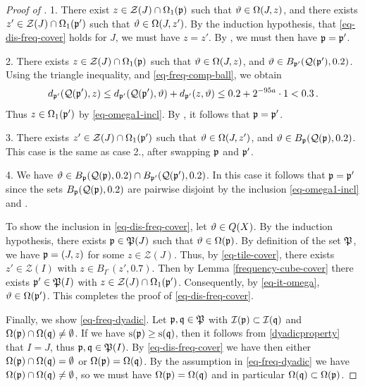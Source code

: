 \begin{proof}[Proof of ]
    1. There exist $z \in \mathcal{Z}(J) \cap \Omega_1({\mathfrak p})$ such that ${\vartheta} \in \Omega(J, z)$, and there exists $z' \in \mathcal{Z}(J) \cap \Omega_1({\mathfrak p}')$ such that ${\vartheta} \in \Omega(J, z')$. By the induction hypothesis, that \eqref{eq-dis-freq-cover} holds for $J$, we must have $z = z'$. By , we must then have ${\mathfrak p} = {\mathfrak p}'$.

    2. There exists $z \in \mathcal{Z}(J) \cap \Omega_1({\mathfrak p})$ such that ${\vartheta} \in \Omega(J,z)$, and ${\vartheta} \in B_{{\mathfrak p}'}({\mathcal{Q}}({\mathfrak p}'), 0.2)$. Using the triangle inequality,  and \eqref{eq-freq-comp-ball}, we obtain
    $$
        d_{{\mathfrak p}'}({\mathcal{Q}}({\mathfrak p}'),z) \le d_{{\mathfrak p}'}({\mathcal{Q}}({\mathfrak p}'), {\vartheta}) + d_{{\mathfrak p}'}(z, {\vartheta}) \le 0.2 + 2^{-95a} \cdot 1 < 0.3\,.
    $$
    Thus $z \in \Omega_1({\mathfrak p}')$ by \eqref{eq-omega1-incl}. By , it follows that ${\mathfrak p} = {\mathfrak p}'$.

    3. There exists $z' \in \mathcal{Z}(J) \cap \Omega_1({\mathfrak p}')$ such that ${\vartheta} \in \Omega(J,z')$, and ${\vartheta} \in B_{{\mathfrak p}}({\mathcal{Q}}({\mathfrak p}), 0.2)$. This case is the same as case 2., after swapping ${\mathfrak p}$ and ${\mathfrak p}'$.

    4. We have ${\vartheta} \in B_{{\mathfrak p}}({\mathcal{Q}}({\mathfrak p}), 0.2) \cap B_{{\mathfrak p}'}({\mathcal{Q}}({\mathfrak p}'), 0.2)$. In this case it follows that ${\mathfrak p} = {\mathfrak p}'$ since the sets $B_{{\mathfrak p}}({\mathcal{Q}}({\mathfrak p}), 0.2)$ are pairwise disjoint by the inclusion \eqref{eq-omega1-incl} and .

    To show the inclusion in \eqref{eq-dis-freq-cover}, let ${\vartheta} \in {Q}(X)$. By the induction hypothesis, there exists ${\mathfrak p} \in {\mathfrak P}(J)$ such that ${\vartheta} \in \Omega({\mathfrak p})$. By definition of the set ${\mathfrak P}$, we have ${\mathfrak p} = (J, z)$ for some $z \in \mathcal{Z}(J)$.
    Thus, by \eqref{eq-tile-cover}, there exists $z' \in \mathcal{Z}(I)$ with $z \in B_{I^\circ}(z', 0.7)$. Then by Lemma \eqref{frequency-cube-cover} there exists ${\mathfrak p}' \in {\mathfrak P}(I)$ with $z \in \mathcal{Z}(J) \cap \Omega_1({\mathfrak p}')$. Consequently, by \eqref{eq-it-omega}, ${\vartheta} \in {\Omega}({\mathfrak p}')$. This completes the proof of \eqref{eq-dis-freq-cover}.

    Finally, we show \eqref{eq-freq-dyadic}. Let ${\mathfrak p}, {\mathfrak q} \in {\mathfrak P}$ with ${\mathcal{I}}({\mathfrak p}) \subset {\mathcal{I}}({\mathfrak q})$ and ${\Omega}({\mathfrak p}) \cap {\Omega}({\mathfrak q}) \ne \emptyset$. If we have ${\mathrm{s}}({\mathfrak p}) \ge {\mathrm{s}}({\mathfrak q})$, then it follows from \eqref{dyadicproperty} that $I = J$, thus ${\mathfrak p}, {\mathfrak q} \in {\mathfrak P}(I)$. By \eqref{eq-dis-freq-cover} we have then either ${\Omega}({\mathfrak p}) \cap {\Omega}({\mathfrak q}) = \emptyset$ or ${\Omega}({\mathfrak p}) = {\Omega}({\mathfrak q})$. By the assumption in \eqref{eq-freq-dyadic} we have ${\Omega}({\mathfrak p}) \cap {\Omega}({\mathfrak q}) \ne \emptyset$, so we must have ${\Omega}({\mathfrak p}) = {\Omega}({\mathfrak q})$ and in particular ${\Omega}({\mathfrak q}) \subset {\Omega}({\mathfrak p})$.


\end{proof}
